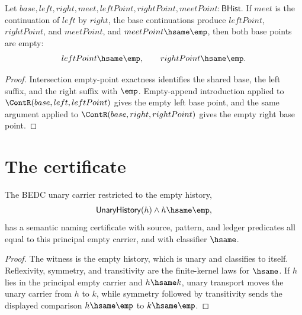 \begin{theorem}
\label{thm:filter-principal-suffix-intersection-empty-point-base-points-empty}
Let $base,left,right,meet,leftPoint,rightPoint,meetPoint:\mathsf{BHist}$.
If $meet$ is the continuation of $left$ by $right$, the base continuations
produce $leftPoint$, $rightPoint$, and $meetPoint$, and
$meetPoint\hsame\emp$, then both base points are empty:
$$
leftPoint\hsame\emp,\qquad rightPoint\hsame\emp.
$$
\end{theorem}
\begin{proof}
Intersection empty-point exactness identifies the shared base, the left
suffix, and the right suffix with $\emp$. Empty-append introduction applied
to $\ContR(base,left,leftPoint)$ gives the empty left base point, and the
same argument applied to $\ContR(base,right,rightPoint)$ gives the empty
right base point.
\end{proof}

\section{The certificate}
\label{sec:filter-certificate}

\begin{theorem}
\label{thm:filter-principal-empty-carrier-semantic-namecert}
The BEDC unary carrier restricted to the empty history,
$$
\mathsf{UnaryHistory}(h)\wedge h\hsame \emp,
$$
has a semantic naming certificate with source, pattern, and ledger predicates
all equal to this principal empty carrier, and with classifier $\hsame$.
\end{theorem}
\begin{proof}
The witness is the empty history, which is unary and classifies to itself.
Reflexivity, symmetry, and transitivity are the finite-kernel laws for
$\hsame$. If $h$ lies in the principal empty carrier and $h\hsame k$, unary
transport moves the unary carrier from $h$ to $k$, while symmetry followed by
transitivity sends the displayed comparison $h\hsame\emp$ to
$k\hsame\emp$.
\end{proof}

